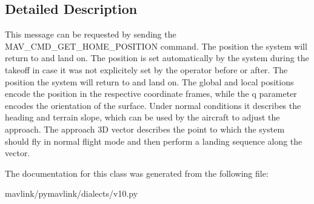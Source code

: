 \subsection{Detailed Description}
\begin{DoxyVerb}This message can be requested by sending the
MAV_CMD_GET_HOME_POSITION command. The position the system
will return to and land on. The position is set automatically
by the system during the takeoff in case it was not
explicitely set by the operator before or after. The position
the system will return to and land on. The global and local
positions encode the position in the respective coordinate
frames, while the q parameter encodes the orientation of the
surface. Under normal conditions it describes the heading and
terrain slope, which can be used by the aircraft to adjust the
approach. The approach 3D vector describes the point to which
the system should fly in normal flight mode and then perform a
landing sequence along the vector.
\end{DoxyVerb}
 

The documentation for this class was generated from the following file\+:\begin{DoxyCompactItemize}
\item 
mavlink/pymavlink/dialects/v10.\+py\end{DoxyCompactItemize}
